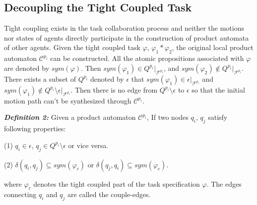 \documentclass[journal]{IEEEtran}
\begin{document}
\subsection{Decoupling the Tight Coupled Task}
Tight coupling exists in the task collaboration process and neither the motions nor states of agents directly participate in the construction of product automata of other agents. Given the tight coupled task $\varphi$, $\varphi_1 \ast \varphi_2$, the original local product automaton $\mathcal{C}^{p_i}$ can be constructed. All the atomic propositions associated with $\varphi$ are denoted by $sym(\varphi)$. Then $sym(\varphi_1) \in Q^{p_i}|_{\mathcal{F}^{p_i}}$, and $sym(\varphi_2) \notin Q^{p_i}|_{\mathcal{F}^{p_i}} $. There exists a subset of $Q^{p_i}$ denoted by $\epsilon$ that $sym(\varphi_1) \in \epsilon |_{\mathcal{F}^{p_i}}$ and $sym(\varphi_1) \notin Q^{p_i} \setminus \epsilon |_{\mathcal{F}^{p_i}}$. Then there is no edge from $Q^{p_i} \setminus \epsilon$ to $\epsilon$ so that the initial motion path can't be synthesized through $\mathcal{C}^{p_i}$.\par
\textbf{\emph{Definition 2:}} Given a product automaton $\mathcal{C}^{p_i}$, If two nodes $q_i$, $q_j$ satisfy following properties:
\par
(1) $q_i \in \epsilon$, $q_j \in Q^{p_i} \setminus \epsilon$ or vice versa.\par
(2) $\delta(q_i,q_j)\subseteq sym(\varphi_c)$ or $\delta(q_j,q_i)\subseteq sym(\varphi_c)$.

where $\varphi_c$ denotes the tight coupled part of the task specification $\varphi$.
The edges connecting $q_i$ and $q_j$ are called the couple-edges.
\end{document}
